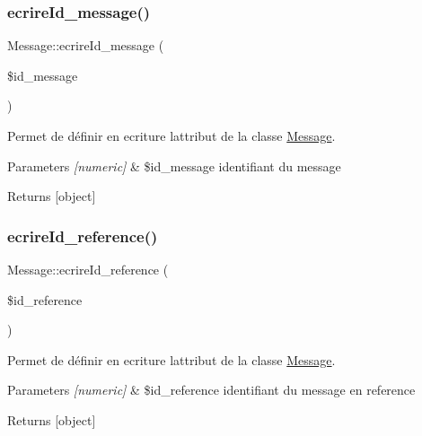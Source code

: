 \subsubsection{\texorpdfstring{ecrire\+Id\+\_\+message()}{ecrireId\_message()}}
{\footnotesize\ttfamily Message\+::ecrire\+Id\+\_\+message (\begin{DoxyParamCaption}\item[{}]{\$id\+\_\+message }\end{DoxyParamCaption})}



Permet de définir en ecriture l\textquotesingle{}attribut de la classe \hyperlink{class_message}{Message}. 


\begin{DoxyParams}{Parameters}
{\em \mbox{[}numeric\mbox{]}} & \$id\+\_\+message identifiant du message \\
\hline
\end{DoxyParams}
\begin{DoxyReturn}{Returns}
\mbox{[}object\mbox{]} 
\end{DoxyReturn}
\mbox{\label{class_message_a4fe696edd1a117bc669e919b1e134501}} 
\subsubsection{\texorpdfstring{ecrire\+Id\+\_\+reference()}{ecrireId\_reference()}}
{\footnotesize\ttfamily Message\+::ecrire\+Id\+\_\+reference (\begin{DoxyParamCaption}\item[{}]{\$id\+\_\+reference }\end{DoxyParamCaption})}



Permet de définir en ecriture l\textquotesingle{}attribut de la classe \hyperlink{class_message}{Message}. 


\begin{DoxyParams}{Parameters}
{\em \mbox{[}numeric\mbox{]}} & \$id\+\_\+reference identifiant du message en reference \\
\hline
\end{DoxyParams}
\begin{DoxyReturn}{Returns}
\mbox{[}object\mbox{]} 
\end{DoxyReturn}
\mbox{\label{class_message_aeecc4b31c3fa4cbfa690a85bfe1b04d3}} 
